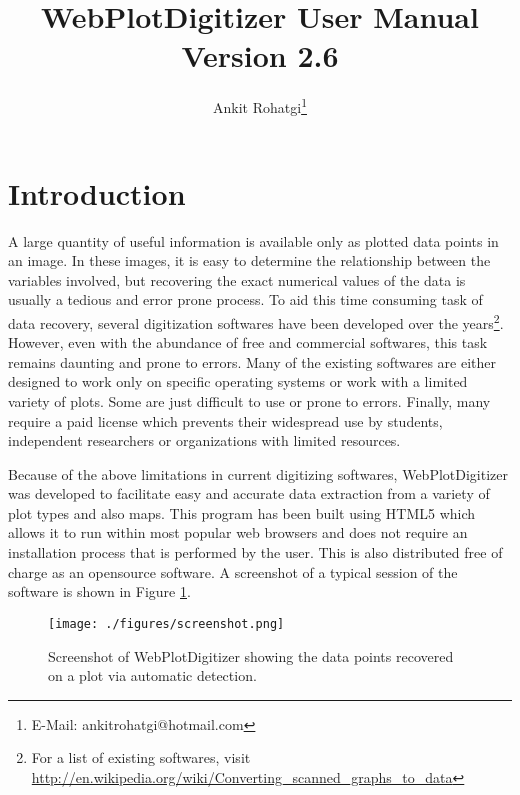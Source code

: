 \documentclass[letterpaper, 10pt]{article}
\begin{document}
\title{WebPlotDigitizer User Manual\\ Version 2.6}
\author{Ankit Rohatgi\footnote{E-Mail: ankitrohatgi@hotmail.com}}
\maketitle
\tableofcontents
\newpage
\section{Introduction}
A large quantity of useful information is available only as plotted data points in an image. In these images, it is easy to determine the relationship between the variables involved, but recovering the exact numerical values of the data is usually a tedious and error prone process. To aid this time consuming task of data recovery, several digitization softwares have been developed over the years\footnote{For a list of existing softwares, visit \url{http://en.wikipedia.org/wiki/Converting_scanned_graphs_to_data}}. However, even with the abundance of free and commercial softwares, this task remains daunting and prone to errors. Many of the existing softwares are either designed to work only on specific operating systems or work with a limited variety of plots. Some are just difficult to use or prone to errors. Finally, many require a paid license which prevents their widespread use by students, independent researchers or organizations with limited resources.

Because of the above limitations in current digitizing softwares, WebPlotDigitizer was developed to facilitate easy and accurate data extraction from a variety of plot types and also maps. This program has been built using HTML5 which allows it to run within most popular web browsers and does not require an installation process that is performed by the user. This is also distributed free of charge as an opensource software. A screenshot of a typical session of the software is shown in Figure \ref{fig:screenshot}.

\begin{figure}
\begin{center}
\texttt{[image: ./figures/screenshot.png]}
\caption{Screenshot of WebPlotDigitizer showing the data points recovered on a plot via automatic detection.}
\label{fig:screenshot}
\end{center}
\end{figure}
\end{document}
